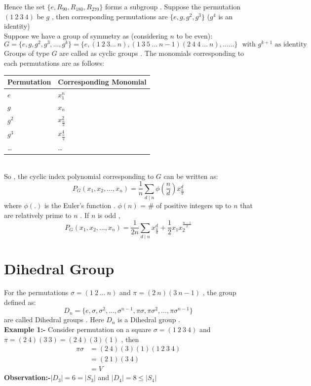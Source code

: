 Hence the set $\{e,R_{90},R_{180},R_{270}\}$ forms a subgroup . Suppose the permutation $(1~2~3~4)$ be $g$ , then corresponding permutations are $\{e,g,g^2,g^3\}$ ($g^4$ is an identity) \\

Suppose we have a group of symmetry as (considering $n$ to be even): $$G=\{e,g,g^2,g^3,\dots,g^k\}=\{e,(1~2~3\dots~n),(1~3~5~\dots~n-1)(2~4~4~\dots~n),\dots\dots\}~~~\textrm{with $g^{k+1}$ as identity}$$
Groups of type $G$ are called as cyclic groups . The monomials corresponding to each permutations are as follows:\\
\begin{tabular}{|l|l|}
    \hline
\textbf{Permutation} & \textbf{Corresponding Monomial} \\\hline
$e$ & $x_1^n$\\
$g$ & $x_n$\\
$g^2$ & $x_{\frac{n}{2}}^2$\\
$g^3$ & $x_{\frac{n}{4}}^4$\\
\dots & \dots\\ \hline
    \end{tabular}\\
So , the cyclic index polynomial corresponding to $G$ can be written as:
$$P_G(x_1,x_2,\dots,x_n)=\frac{1}{n}\sum_{d\mid n}\phi(\frac{n}{d})x_{\frac{n}{d}}^d$$
where $\phi(.)$ is the Euler's function . $\phi(n)$ = \# of positive integers up to $n$ that are relatively prime to $n$ . If $n$ is odd ,
$$P_G(x_1,x_2,\dots,x_n) = \frac{1}{2n}\sum_{d\mid n}x_{\frac{n}{d}}^d + \frac{1}{2}x_1x_2^{\frac{n-1}{2}}$$
\section{Dihedral Group}
For the permutations $\sigma=(1~2~\dots~n)$ and $\pi=(2~n)(3~n-1)$ , the group defined as:
$$D_n = \{e,\sigma,\sigma^2,\dots,\sigma^{n-1},\pi\sigma,\pi\sigma^2,\dots,\pi\sigma^{n-1}\}$$
are called Dihedral groups . Here $D_n$ is a Dihedral group .\\ 
\textbf{Example 1:-}
Consider permutation on a square $\sigma = (1~2~3~4)$ and $\pi=(2~4)(3~3)=(2~4)(3)(1)$ , then 
\begin{align*}
    \pi\sigma &= (2~4)(3)(1)(1~2~3~4)\\
    &= (2~1)(3~4)\\
    &= V
\end{align*}
\textbf{Observation:-}$|D_3|=6=|S_3|$ and $|D_4|=8\le|S_4|$

